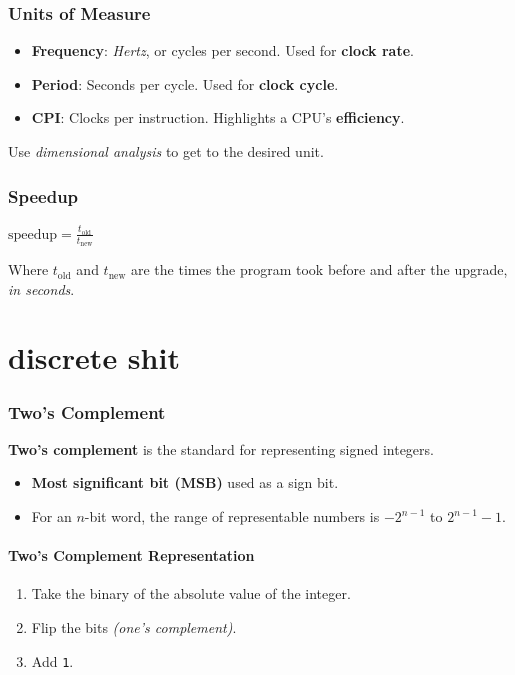 \documentclass[12pt, letterpaper]{article}
\begin{document}
\section*{Units of Measure}
\begin{itemize}
  \item \textbf{Frequency}: \textit{Hertz}, or cycles per second.
    Used for \textbf{clock rate}.
  \item \textbf{Period}: Seconds per cycle. Used for \textbf{clock cycle}.
  \item \textbf{CPI}: Clocks per instruction. Highlights a CPU's
    \textbf{efficiency}.
\end{itemize}

Use \textit{dimensional analysis} to get to the desired unit.

\section*{Speedup}

$ \textrm{speedup} = \frac{t_{\textrm{old}}}{t_{\textrm{new}}} $

Where $ t_{\textrm{old}} $ and $ t_{\textrm{new}} $ are the times the
program took before and after the upgrade, \textit{in seconds}.

\part*{discrete shit}

\section*{Two's Complement}

\textbf{Two's complement} is the standard for representing signed integers.

\begin{itemize}
  \item \textbf{Most significant bit (MSB)} used as a sign bit.
  \item For an $n$-bit word, the range of representable numbers is $
    -2^{n-1} $ to $ 2^{n-1} - 1 $.
\end{itemize}

\subsection*{Two's Complement Representation}

\begin{enumerate}
  \item Take the binary of the absolute value of the integer.
  \item Flip the bits \textit{(one's complement)}.
  \item Add \texttt{1}.
\end{enumerate}
\end{document}
